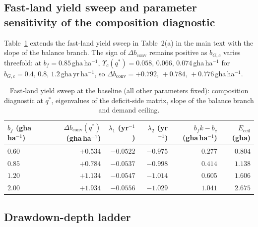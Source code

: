 \documentclass[11pt,a4paper]{article}
\newcommand{\dconv}{\Delta b_{\mathrm{conv}}}
\newcommand{\Ups}{\Upsilon_c}
\newcommand{\Eceil}{E_{\mathrm{ceil}}}
\begin{document}
\subsection{Fast-land yield sweep and parameter sensitivity of the composition diagnostic}\label{si:sweep}

Table~\ref{tab:si_sweep} extends the fast-land yield sweep in Table~2(a) in the main text with the slope of the balance branch. The sign of $\dconv$ remains positive as $b_{G,c}$ varies threefold: at $b_f=0.85$\,gha\,ha$^{-1}$, $\Ups(q^*)=0.058,\,0.066,\,0.074$\,gha\,ha$^{-1}$ for $b_{G,c}=0.4,\,0.8,\,1.2$\,gha\,yr\,ha$^{-1}$, so $\dconv=+0.792,\,+0.784,\,+0.776$\,gha\,ha$^{-1}$.

\begin{table}[htbp]
\centering\small
\caption{Fast-land yield sweep at the baseline (all other parameters fixed): composition diagnostic at $q^*$, eigenvalues of the deficit-side matrix, slope of the balance branch and demand ceiling.}
\label{tab:si_sweep}
\begin{tabular}{l r r r r r}
\toprule
$b_f$ (gha\,ha$^{-1}$) & $\dconv(q^*)$ (gha\,ha$^{-1}$) & $\lambda_1$ (yr$^{-1}$) & $\lambda_2$ (yr$^{-1}$) & $b_fk-b_c$ (gha\,ha$^{-1}$) & $\Eceil$ (gha) \\
\midrule
$0.60$ & $+0.534$ & $-0.0522$ & $-0.975$ & $0.277$ & $0.804$ \\
$0.85$ & $+0.784$ & $-0.0537$ & $-0.998$ & $0.414$ & $1.138$ \\
$1.20$ & $+1.134$ & $-0.0547$ & $-1.014$ & $0.605$ & $1.606$ \\
$2.00$ & $+1.934$ & $-0.0556$ & $-1.029$ & $1.041$ & $2.675$ \\
\bottomrule
\end{tabular}
\end{table}

\subsection{Drawdown-depth ladder}\label{si:ladder}
\end{document}

